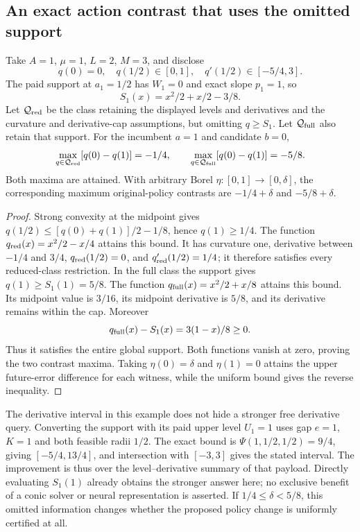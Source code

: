 \subsection{An exact action contrast that uses the omitted support}
\label{supp:fullsupportwitness125}

\begin{proposition}
\label{prop:fullsupportwitness125}
Take $A=1$, $\mu=1$, $L=2$, $M=3$, and disclose
\[
 q(0)=0,\quad q(1/2)\in[0,1],\quad
 q'(1/2)\in[-5/4,3].
\]
The paid support at $a_1=1/2$ has $W_1=0$ and exact slope
$p_1=1$, so
\[
              S_1(x)=x^2/2+x/2-3/8.
\]
Let $\mathcal Q_{\rm red}$ be the class retaining the displayed
levels and derivatives and the curvature and derivative-cap assumptions,
but omitting $q\ge S_1$. Let $\mathcal Q_{\rm full}$ also retain
that support. For the incumbent $a=1$ and candidate $b=0$,
\[
 \max_{q\in\mathcal Q_{\rm red}}[q(0)-q(1)]=-1/4,
 \qquad
 \max_{q\in\mathcal Q_{\rm full}}[q(0)-q(1)]=-5/8.
\]
Both maxima are attained. With arbitrary Borel
$\eta:[0,1]\to[0,\delta]$, the corresponding maximum original-policy
contrasts are $-1/4+\delta$ and $-5/8+\delta$.
\end{proposition}

\begin{proof}
Strong convexity at the midpoint gives
$q(1/2)\le[q(0)+q(1)]/2-1/8$, hence $q(1)\ge1/4$.
The function $q_{\rm red}(x)=x^2/2-x/4$ attains this bound.
It has curvature one, derivative between $-1/4$ and $3/4$,
$q_{\rm red}(1/2)=0$, and $q_{\rm red}'(1/2)=1/4$; it therefore
satisfies every reduced-class restriction. In the full class the
support gives $q(1)\ge S_1(1)=5/8$. The function
$q_{\rm full}(x)=x^2/2+x/8$ attains this bound. Its midpoint
value is $3/16$, its midpoint derivative is $5/8$, and its
derivative remains within the cap. Moreover
\[
                  q_{\rm full}(x)-S_1(x)=3(1-x)/8\ge0.
\]
Thus it satisfies the entire global support. Both functions vanish
at zero, proving the two contrast maxima. Taking $\eta(0)=\delta$
and $\eta(1)=0$ attains the upper future-error difference for each
witness, while the uniform bound gives the reverse inequality.
\end{proof}

The derivative interval in this example does not hide a stronger free
derivative query. Converting the support with its paid upper level
$U_1=1$ uses gap $e=1$, $K=1$ and both feasible radii $1/2$.
The exact bound is $\Psi(1,1/2,1/2)=9/4$, giving
$[-5/4,13/4]$, and intersection with $[-3,3]$ gives the stated
interval. The improvement is thus over the level--derivative summary of
that payload. Directly evaluating $S_1(1)$ already obtains the stronger
answer here; no exclusive benefit of a conic solver or neural
representation is asserted. If $1/4\le\delta<5/8$, this omitted
information changes whether the proposed policy change is uniformly
certified at all.


